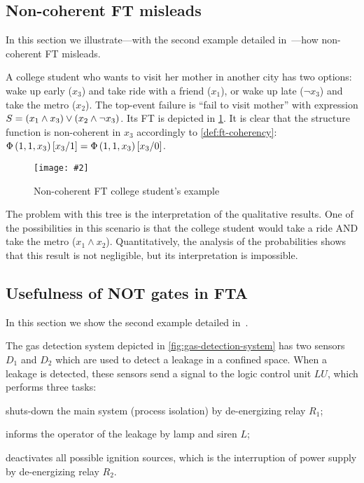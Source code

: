 \documentclass[12pt,openright,twoside,a4paper,oldfontcommands,english,brazil,draft]{abntex2}
\theoremstyle{theo}
\newcommand{\includegraphicsaspectratio}[2][1]{%
  \texttt{[image: \#2]}%
}
\newcommand{\parsin}[1]{\ensuremath\left( #1 \right)}
\newcommand{\squaresin}[1]{\ensuremath\left[ #1 \right]}
\def\ftcoherencyop{\ensuremath\operatorname{\Phi}}
\newcommand{\ftcoherency}[1]{\ensuremath\ftcoherencyop\parsin{#1}}
\newcommand{\replace}[2]{\ensuremath\squaresin{#1\middle/#2}}
\begin{document}
\subsection{Non-coherent \ac{FT} misleads}
\label{sec:non-coherent-misleads-example}

In this section we illustrate---with the second example detailed in~\cite{Oliv2006}---how non-coherent \ac{FT} misleads.

A college student who wants to visit her mother in another city has two options: wake up early ($x_3$) and take ride with a friend ($x_1$), or wake up late ($\lnot x_3$) and take the metro ($x_2$).
The top-event failure is ``fail to visit mother'' with expression $S = \parsin{x_1 \land x_3} \lor \parsin{x_2 \land \lnot x_3}$.
Its \acl{FT} is depicted in \cref{fig:non-coherent-ft-example}.
It is clear that the structure function is non-coherent in $x_3$ accordingly to \cref{def:ft-coherency}: $\ftcoherency{1,1,x_3}\replace{x_3}{1}=\ftcoherency{1,1,x_3}\replace{x_3}{0}$.

\begin{figure}[t]
  \centering
  \includegraphicsaspectratio[0.55]{non-coherent-ft-example}
  \caption{Non-coherent \ac{FT} college student's example}
  \label{fig:non-coherent-ft-example}
\end{figure}

The problem with this tree is the interpretation of the qualitative results.
One of the possibilities in this scenario is that the college student would take a ride \ac{AND} take the metro ($x_1 \land x_2$).
Quantitatively, the analysis of the probabilities shows that this result is not negligible, but its interpretation is impossible.

\subsection[Usefulness of NOT gates in FTA]{Usefulness of \ac{NOT} gates in \ac{FTA}}
\label{sec:non-coherent-usefulness}

In this section we show the second example detailed in~\cite{Andrews2001}.

The gas detection system depicted in \cref{fig:gas-detection-system} has two sensors $D_1$ and $D_2$ which are used to detect a leakage in a confined space.
When a leakage is detected, these sensors send a signal to the logic control unit $LU$, which performs three tasks:
%
\begin{alineas}
  \item shuts-down the main system (process isolation) by de-energizing relay $R_1$;
  \item informs the operator of the leakage by lamp and siren $L$;
  \item deactivates all possible ignition sources, which is the interruption of power supply by de-energizing relay $R_2$.
\end{alineas}
\end{document}

